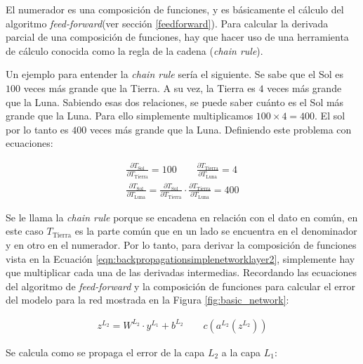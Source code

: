 El numerador es una composición de funciones, y es básicamente el cálculo del algoritmo \textit{feed-forward}(ver sección \ref{feedforward}). Para calcular la derivada parcial de una composición de funciones, hay que hacer uso de una herramienta de cálculo conocida como la regla de la cadena (\textit{chain rule}).
\newline

Un ejemplo para entender la \textit{chain rule} sería el siguiente. Se sabe que el Sol es $100$ veces más grande que la Tierra. A su vez, la Tierra es $4$ veces más grande que la Luna. Sabiendo esas dos relaciones, se puede saber cuánto es el Sol más grande que la Luna. Para ello simplemente multiplicamos $100 \times 4 = 400$. El sol por lo tanto es $400$ veces más grande que la Luna. Definiendo este problema con ecuaciones:

\begin{equation}
\begin{split}
    \frac{\partial T_{\text{Sol}}}{\partial T_{\text{Tierra}}} = 100
    \qquad
    \frac{\partial T_{\text{Tierra}}}{\partial T_{\text{Luna}}} = 4 \\
    \frac{\partial T_{\text{Sol}}}{\partial T_{\text{Luna}}} = \frac{\partial T_{\text{Sol}}}{\partial T_{\text{Tierra}}} \cdot \frac{\partial T_{\text{Tierra}}}{\partial T_{\text{Luna}}} = 400 \nonumber
\end{split}
\end{equation}

Se le llama la \textit{chain rule} porque se encadena en relación con el dato en común, en este caso $T_\text{Tierra}$ es la parte común que en un lado se encuentra en el denominador y en otro en el numerador. Por lo tanto, para derivar la composición de funciones vista en la Ecuación \ref{eqn:backpropagationsimplenetworklayer2}, simplemente hay que multiplicar cada una de las derivadas intermedias. Recordando las ecuaciones del algoritmo de \textit{feed-forward} y la composición de funciones para calcular el error del modelo para la red mostrada en la Figura \ref{fig:basic_network}:

\begin{equation}
\begin{split}
    z^{L_2} = W^{L_2} \cdot y^{L_1} + b^{L_2}
    \qquad
    c(a^{L_2}(z^{L_2}))
\end{split}
\end{equation}

Se calcula como se propaga el error de la capa $L_2$ a la capa $L_1$:

